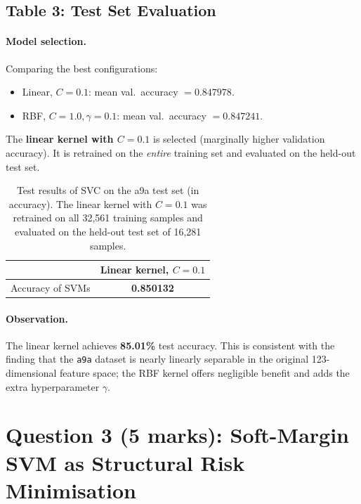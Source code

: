 \documentclass[12pt,a4paper]{article}
\begin{document}
\subsection{Table 3: Test Set Evaluation}

\paragraph{Model selection.}
Comparing the best configurations:
\begin{itemize}[leftmargin=*]
  \item Linear, $C=0.1$: mean val.\ accuracy $= 0.847978$.
  \item RBF, $C=1.0, \gamma=0.1$: mean val.\ accuracy $= 0.847241$.
\end{itemize}
The \textbf{linear kernel with $C=0.1$} is selected (marginally higher
validation accuracy).  It is retrained on the \emph{entire} training set
and evaluated on the held-out test set.

\begin{table}[h!]
\centering
\begin{tabular}{lc}
\toprule
 & Linear kernel, $C = 0.1$ \\
\midrule
Accuracy of SVMs & \textbf{0.850132} \\
\bottomrule
\end{tabular}
\caption{Test results of SVC on the a9a test set (in accuracy).
         The linear kernel with $C=0.1$ was retrained on all 32,561 training
         samples and evaluated on the held-out test set of 16,281 samples.}
\label{tab:test}
\end{table}

\paragraph{Observation.}
The linear kernel achieves \textbf{85.01\%} test accuracy.
This is consistent with the finding that the \texttt{a9a} dataset is nearly
linearly separable in the original 123-dimensional feature space; the RBF
kernel offers negligible benefit and adds the extra hyperparameter $\gamma$.

\newpage
\section{Question 3 (5 marks): Soft-Margin SVM as Structural Risk Minimisation}
\end{document}
